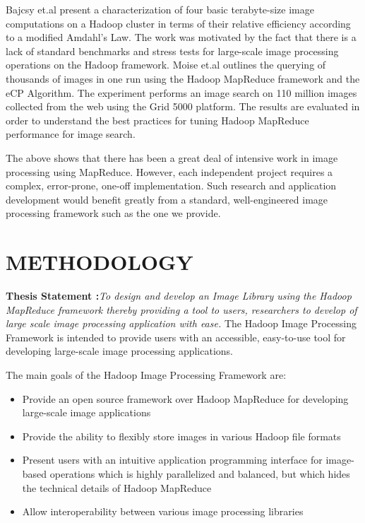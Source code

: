 \documentclass{osuthesis}
\begin{document}
				Bajcsy et.al \cite{Bajcsy2013} present a characterization of four
				basic terabyte-size image computations on a Hadoop cluster in terms of
				their relative efficiency according to a modified Amdahl's Law. The
				work was motivated by the fact that there is a lack of standard
				benchmarks and stress tests for large-scale image processing
				operations on the Hadoop framework. Moise et.al \cite{Moise2013}
				outlines the querying of thousands of images in one run using the
				Hadoop MapReduce framework and the eCP Algorithm. The experiment
				performs an image search on 110 million images collected from the web
				using the Grid 5000 platform. The results are evaluated in order to
				understand the best practices for tuning Hadoop MapReduce performance
				for image search.
				
				The above shows that there has been a great deal of intensive work in
				image processing using MapReduce.  However, each independent project
				requires a complex, error-prone, one-off implementation.  Such
				research and application development would benefit greatly from a
				standard, well-engineered image processing framework such as the one
				we provide.
				
				\chapter{METHODOLOGY}
				\textbf{Thesis Statement :}\textit{To design and develop an Image Library using the Hadoop MapReduce framework thereby providing a tool to users, researchers to develop of large scale image processing application with ease.} 
				\newline
				\newline
				The Hadoop Image Processing Framework is intended to provide users
				with an accessible, easy-to-use tool for developing large-scale image
				processing applications.
				
				The main goals of the Hadoop Image Processing Framework are:
				\begin{itemize}
					\item Provide an open source framework over Hadoop MapReduce for
					developing large-scale image applications
					\item Provide the ability to flexibly store images in various Hadoop
					file formats
					\item Present users with an intuitive application programming
					interface for image-based operations which is highly parallelized
					and balanced, but which hides the technical details of Hadoop
					MapReduce
					\item Allow interoperability between various image processing
					libraries
				\end{itemize}
				
\end{document}
